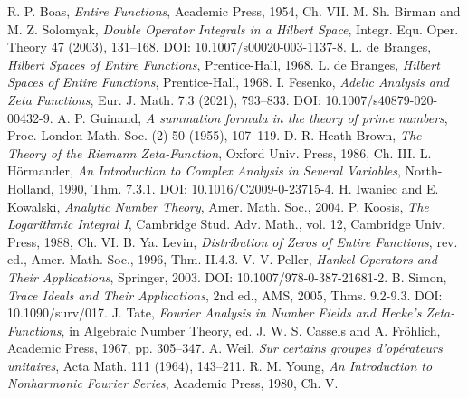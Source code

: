 \documentclass[12pt]{article}
\begin{document}
\begin{thebibliography}{20}
 R. P. Boas, \emph{Entire Functions}, Academic Press, 1954, Ch. VII.
 M. Sh. Birman and M. Z. Solomyak, \emph{Double Operator Integrals in a Hilbert Space}, Integr. Equ. Oper. Theory 47 (2003), 131–168. DOI: 10.1007/s00020-003-1137-8.
 L. de Branges, \emph{Hilbert Spaces of Entire Functions}, Prentice-Hall, 1968.
 L. de Branges, \emph{Hilbert Spaces of Entire Functions}, Prentice-Hall, 1968.
 I. Fesenko, \emph{Adelic Analysis and Zeta Functions}, Eur. J. Math. 7:3 (2021), 793–833. DOI: 10.1007/s40879-020-00432-9.
 A. P. Guinand, \emph{A summation formula in the theory of prime numbers}, Proc. London Math. Soc. (2) 50 (1955), 107–119.
 D. R. Heath-Brown, \emph{The Theory of the Riemann Zeta-Function}, Oxford Univ. Press, 1986, Ch. III.
 L. Hörmander, \emph{An Introduction to Complex Analysis in Several Variables}, North-Holland, 1990, Thm. 7.3.1. DOI: 10.1016/C2009-0-23715-4.
 H. Iwaniec and E. Kowalski, \emph{Analytic Number Theory}, Amer. Math. Soc., 2004.
 P. Koosis, \emph{The Logarithmic Integral I}, Cambridge Stud. Adv. Math., vol. 12, Cambridge Univ. Press, 1988, Ch. VI.
 B. Ya. Levin, \emph{Distribution of Zeros of Entire Functions}, rev. ed., Amer. Math. Soc., 1996, Thm. II.4.3.
 V. V. Peller, \emph{Hankel Operators and Their Applications}, Springer, 2003. DOI: 10.1007/978-0-387-21681-2.
 B. Simon, \emph{Trace Ideals and Their Applications}, 2nd ed., AMS, 2005, Thms. 9.2-9.3. DOI: 10.1090/surv/017.
 J. Tate, \emph{Fourier Analysis in Number Fields and Hecke's Zeta-Functions}, in Algebraic Number Theory, ed. J. W. S. Cassels and A. Fröhlich, Academic Press, 1967, pp. 305–347.
 A. Weil, \emph{Sur certains groupes d'opérateurs unitaires}, Acta Math. 111 (1964), 143–211.
 R. M. Young, \emph{An Introduction to Nonharmonic Fourier Series}, Academic Press, 1980, Ch. V.
\end{thebibliography}
\end{document}
